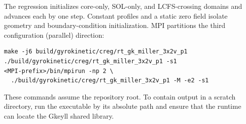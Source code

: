\documentclass[11pt]{article}
\begin{document}
The regression  initializes core-only,
SOL-only, and LCFS-crossing domains and advances each by one step. Constant
profiles and a static zero field isolate geometry and boundary-condition
initialization. MPI partitions the third configuration (parallel) direction:
\begin{verbatim}
make -j6 build/gyrokinetic/creg/rt_gk_miller_3x2v_p1
./build/gyrokinetic/creg/rt_gk_miller_3x2v_p1 -s1
<MPI-prefix>/bin/mpirun -np 2 \
  ./build/gyrokinetic/creg/rt_gk_miller_3x2v_p1 -M -e2 -s1
\end{verbatim}
These commands assume the repository root. To contain output in a scratch
directory, run the executable by its absolute path and ensure that the runtime
can locate the Gkeyll shared library.
\end{document}
